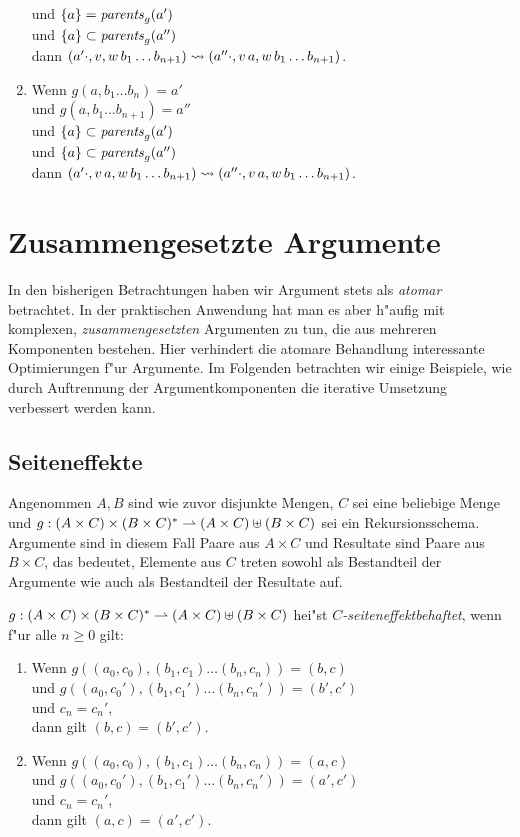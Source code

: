 \documentclass[12pt,a4paper]{article}
\begin{document}
\begin{enumerate}
  und $\{a\} = \mathit{parents}_g(a')$ \\
  und $\{a\} \subset \mathit{parents}_g(a'')$ \\
  dann $(a' \cdot,v,w\,b_1 \ldots b_{n+1}) \rightsquigarrow (a'' \cdot,v\,a,w\,b_1 \ldots b_{n+1})$.
\item Wenn $g(a,b_1 \ldots b_n) = a'$ \\
  und $g(a,b_1 \ldots b_{n+1}) = a''$ \\
  und $\{a\} \subset \mathit{parents}_g(a')$ \\
  und $\{a\} \subset \mathit{parents}_g(a'')$ \\
  dann $(a' \cdot,v\,a,w\,b_1 \ldots b_{n+1}) \rightsquigarrow (a'' \cdot,v\,a,w\,b_1 \ldots b_{n+1})$.
\end{enumerate}


\section{Zusammengesetzte Argumente}

In den bisherigen Betrachtungen haben wir Argument stets als \emph{atomar} betrachtet. In der praktischen
Anwendung hat man es aber h"aufig mit komplexen, \emph{zusammengesetzten} Argumenten zu tun, die aus mehreren
Komponenten bestehen. Hier verhindert die atomare Behandlung interessante Optimierungen f"ur Argumente. Im
Folgenden betrachten wir einige Beispiele, wie durch Auftrennung der Argumentkomponenten die iterative
Umsetzung verbessert werden kann.


\subsection{Seiteneffekte}

Angenommen $A,B$ sind wie zuvor disjunkte Mengen, $C$ sei eine beliebige Menge und
$g: (A \times C) \times (B \times C)^* \rightharpoonup (A \times C) \uplus (B \times C)$ sei ein
Rekursionsschema. Argumente sind in diesem Fall Paare aus $A \times C$ und Resultate sind
Paare aus $B \times C$, das bedeutet, Elemente aus $C$ treten sowohl als Bestandteil der
Argumente wie auch als Bestandteil der Resultate auf.

\begin{definition}
  $g: (A \times C) \times (B \times C)^* \rightharpoonup (A \times C) \uplus (B \times C)$ hei"st
  \emph{$C$-seiteneffektbehaftet}, wenn f"ur alle $n \ge 0$ gilt:
  \begin{enumerate}
  \item Wenn $g((a_0,c_0),(b_1,c_1) \ldots (b_n,c_n)) = (b,c)$ \\
    und $g((a_0,c_0'),(b_1,c_1') \ldots (b_n,c_n')) = (b',c')$ \\
    und $c_n = c_n'$, \\
    dann gilt $(b,c) = (b',c')$.
  \item Wenn $g((a_0,c_0),(b_1,c_1) \ldots (b_n,c_n)) = (a,c)$ \\
    und $g((a_0,c_0'),(b_1,c_1') \ldots (b_n,c_n')) = (a',c')$ \\
    und $c_n = c_n'$, \\
    dann gilt $(a,c) = (a',c')$.
  \end{enumerate}
\end{definition}
\end{document}
